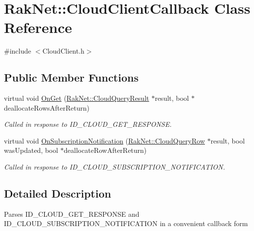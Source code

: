\hypertarget{class_rak_net_1_1_cloud_client_callback}{\section{Rak\-Net\-:\-:Cloud\-Client\-Callback Class Reference}
\label{class_rak_net_1_1_cloud_client_callback}
}


{\ttfamily \#include $<$Cloud\-Client.\-h$>$}

\subsection*{Public Member Functions}
\begin{DoxyCompactItemize}
\item 
virtual void \hyperlink{class_rak_net_1_1_cloud_client_callback_a7d5e130174f32b980cb217335945e322}{On\-Get} (\hyperlink{struct_rak_net_1_1_cloud_query_result}{Rak\-Net\-::\-Cloud\-Query\-Result} $\ast$result, bool $\ast$deallocate\-Rows\-After\-Return)
\begin{DoxyCompactList}\small\item\em Called in response to I\-D\-\_\-\-C\-L\-O\-U\-D\-\_\-\-G\-E\-T\-\_\-\-R\-E\-S\-P\-O\-N\-S\-E. \end{DoxyCompactList}\item 
virtual void \hyperlink{class_rak_net_1_1_cloud_client_callback_ad6b4a80a7782ed08dc03c0fcadeeabce}{On\-Subscription\-Notification} (\hyperlink{struct_rak_net_1_1_cloud_query_row}{Rak\-Net\-::\-Cloud\-Query\-Row} $\ast$result, bool was\-Updated, bool $\ast$deallocate\-Row\-After\-Return)
\begin{DoxyCompactList}\small\item\em Called in response to I\-D\-\_\-\-C\-L\-O\-U\-D\-\_\-\-S\-U\-B\-S\-C\-R\-I\-P\-T\-I\-O\-N\-\_\-\-N\-O\-T\-I\-F\-I\-C\-A\-T\-I\-O\-N. \end{DoxyCompactList}\end{DoxyCompactItemize}


\subsection{Detailed Description}
Parses I\-D\-\_\-\-C\-L\-O\-U\-D\-\_\-\-G\-E\-T\-\_\-\-R\-E\-S\-P\-O\-N\-S\-E and I\-D\-\_\-\-C\-L\-O\-U\-D\-\_\-\-S\-U\-B\-S\-C\-R\-I\-P\-T\-I\-O\-N\-\_\-\-N\-O\-T\-I\-F\-I\-C\-A\-T\-I\-O\-N in a convenient callback form 

